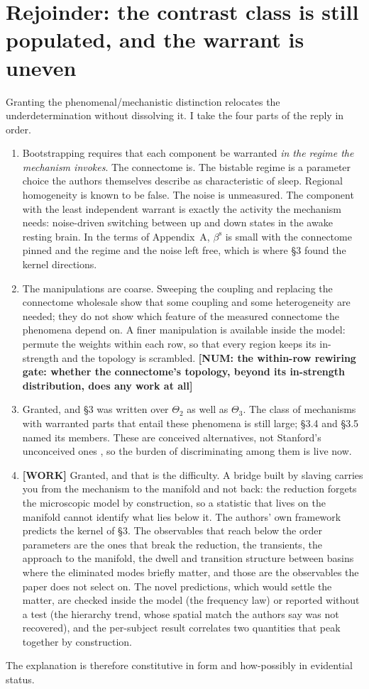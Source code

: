 \documentclass[11pt]{article}
\newcommand{\NUM}[1]{\textcolor{red!70!black}{\textbf{[NUM: #1]}}}
\newcommand{\WORK}[1]{\textcolor{orange!85!red}{\textbf{[WORK]} #1}}
\begin{document}
\section{Rejoinder: the contrast class is still populated, and the warrant is uneven}
Granting the phenomenal/mechanistic distinction relocates the underdetermination without dissolving it. I take the four parts of the reply in order.
\begin{enumerate}
\item[To R1] Bootstrapping requires that each component be warranted \emph{in the regime the mechanism invokes}. The connectome is. The bistable regime is a parameter choice the authors themselves describe as characteristic of sleep. Regional homogeneity is known to be false. The noise is unmeasured. The component with the least independent warrant is exactly the activity the mechanism needs: noise-driven switching between up and down states in the awake resting brain. In the terms of Appendix~A, $\beta^{\mathrm{s}}$ is small with the connectome pinned and the regime and the noise left free, which is where \S3 found the kernel directions.
\item[To R2] The manipulations are coarse. Sweeping the coupling and replacing the connectome wholesale show that some coupling and some heterogeneity are needed; they do not show which feature of the measured connectome the phenomena depend on. A finer manipulation is available inside the model: permute the weights within each row, so that every region keeps its in-strength and the topology is scrambled. \NUM{the within-row rewiring gate: whether the connectome's topology, beyond its in-strength distribution, does any work at all}
\item[To R3] Granted, and \S3 was written over $\Theta_2$ as well as $\Theta_3$. The class of mechanisms with warranted parts that entail these phenomena is still large; \S3.4 and \S3.5 named its members. These are conceived alternatives, not Stanford's unconceived ones \parencite{stanford2006}, so the burden of discriminating among them is live now.
\item[To R4] \WORK{Granted, and that is the difficulty. A bridge built by slaving carries you from the mechanism to the manifold and not back: the reduction forgets the microscopic model by construction, so a statistic that lives on the manifold cannot identify what lies below it. The authors' own framework predicts the kernel of \S3. The observables that reach below the order parameters are the ones that break the reduction, the transients, the approach to the manifold, the dwell and transition structure between basins where the eliminated modes briefly matter, and those are the observables the paper does not select on.} The novel predictions, which would settle the matter, are checked inside the model (the frequency law) or reported without a test (the hierarchy trend, whose spatial match the authors say was not recovered), and the per-subject result correlates two quantities that peak together by construction.
\end{enumerate}
The explanation is therefore constitutive in form and how-possibly in evidential status.
\end{document}
